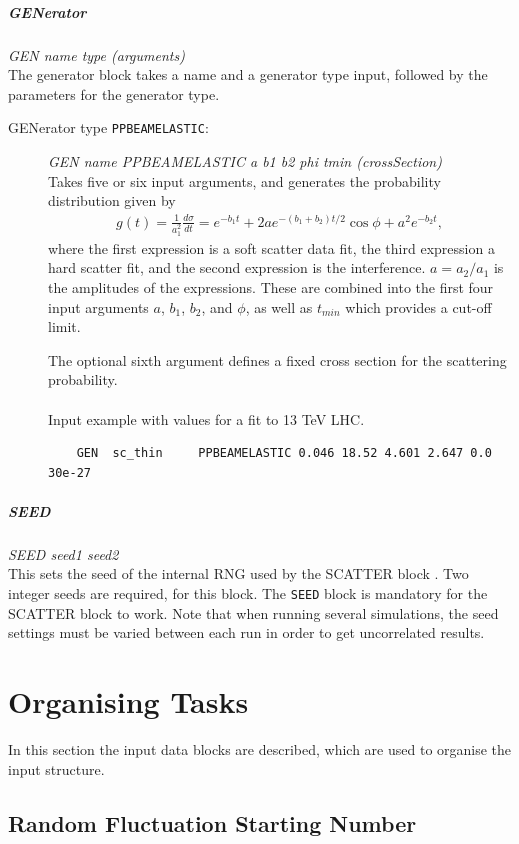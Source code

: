 \subparagraph{GENerator} \emph{GEN name type (arguments)} \\
The generator block takes a name and a generator type input, followed by the parameters for the
generator type.
\begin{description}
\item[GENerator type \texttt{PPBEAMELASTIC}:] \emph{GEN name PPBEAMELASTIC a b1 b2 phi tmin (crossSection)}\\
Takes five or six input arguments, and generates the probability distribution given by
\begin{align}
    g(t) = \frac{1}{a_1^2}\frac{d\sigma}{dt} = e^{-b_1 t}+ 2ae^{-(b_1+b_2)t/2}\cos{\phi} + a^2e^{-b_2 t},
\end{align}
where the first expression is a soft scatter data fit, the third expression a hard scatter fit,
and the second expression is the interference. $a = a_2/a_1$ is the amplitudes of the expressions.
These are combined into the first four input arguments $a$, $b_1$, $b_2$, and $\phi$, as well as
$t_{min}$ which provides a cut-off limit.

The optional sixth argument defines a fixed cross section for the scattering probability.\\
\\
\noindent Input example with values for a fit to 13 TeV LHC.
\begin{verbatim}
    GEN  sc_thin     PPBEAMELASTIC 0.046 18.52 4.601 2.647 0.0 30e-27
\end{verbatim}
\end{description}

\subparagraph{SEED} \emph{SEED seed1 seed2}\\
This sets the seed of the internal RNG used by the SCATTER block .
Two integer seeds are required, for this block.
The \texttt{SEED} block is mandatory for the SCATTER block to work.
Note that when running several simulations, the seed settings must be varied between each run in order to get uncorrelated results.

\section{Organising Tasks}

In this section the input data blocks are described, which are used to
organise the input structure.

\subsection{Random Fluctuation Starting Number} \label{FluNum}

